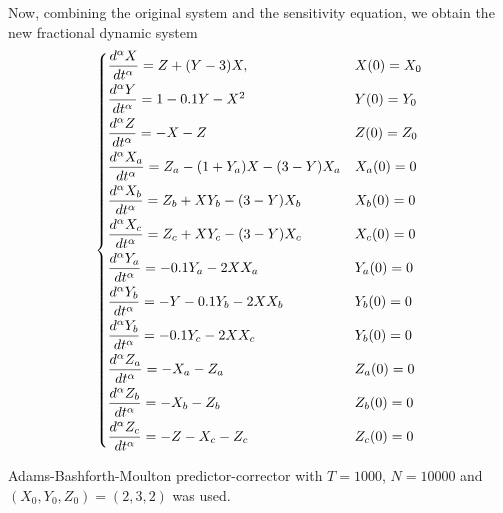 Now, combining the original system and the sensitivity equation, we obtain the new fractional dynamic system
\begin{equation}
	\begin{cases}
	\dfrac{d^{\alpha}X}{dt^{\alpha}}=Z+(Y-3)X, & X(0)=X_0\vspace{1.25mm}\\
    \dfrac{d^{\alpha}Y}{dt^{\alpha}}=1-0.1Y-X^2 & Y(0)=Y_0\vspace{1.25mm}\\
    \dfrac{d^{\alpha}Z}{dt^{\alpha}}=-X-Z & Z(0)=Z_0\vspace{1.25mm}\\
    \dfrac{d^{\alpha}X_a}{dt^{\alpha}}=Z_a-(1+Y_a)X-(3-Y)X_a & X_a(0)=0\vspace{1.25mm}\\
    \dfrac{d^{\alpha}X_b}{dt^{\alpha}}=Z_b+XY_b-(3-Y)X_b & X_b(0)=0\vspace{1.25mm}\\
    \dfrac{d^{\alpha}X_c}{dt^{\alpha}}=Z_c+XY_c-(3-Y)X_c & X_c(0)=0\vspace{1.25mm}\\
    \dfrac{d^{\alpha}Y_a}{dt^{\alpha}}=-0.1Y_a-2XX_a & Y_a(0)=0\vspace{1.25mm}\\
    \dfrac{d^{\alpha}Y_b}{dt^{\alpha}}=-Y-0.1Y_b-2XX_b & Y_b(0)=0\vspace{1.25mm}\\
    \dfrac{d^{\alpha}Y_b}{dt^{\alpha}}=-0.1Y_c-2XX_c & Y_b(0)=0\vspace{1.25mm}\\
    \dfrac{d^{\alpha}Z_a}{dt^{\alpha}}= -X_a -Z_a& Z_a(0)=0\vspace{1.25mm}\\
    \dfrac{d^{\alpha}Z_b}{dt^{\alpha}}= -X_b -Z_b& Z_b(0)=0\vspace{1.25mm}\\
    \dfrac{d^{\alpha}Z_c}{dt^{\alpha}}= -Z-X_c -Z_c& Z_c(0)=0
	\end{cases}
\end{equation}

Adams-Bashforth-Moulton predictor-corrector with $T=1000$, $N=10000$ and $(X_0,Y_0,Z_0)=(2,3,2)$ was used.

